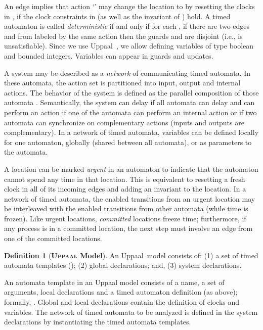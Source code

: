 \documentclass[copyright,creativecommons]{eptcs}
\theoremstyle{definition}
\newtheorem{definition}{Definition}
\newcommand{\Uppaal}{{\sc Uppaal}\xspace}
\begin{document}
An edge   implies that action `' may change the location  to  by resetting the clocks in ,  if the clock constraints in  (as well as the invariant of ) hold.
A timed automaton is called {\em deterministic} if and only if for
each , if there are two edges  and  from  labeled by the same
action 
then the guards  and  are disjoint (i.e.,  is unsatisfiable).
Since we use \Uppaal~\cite{LarsenPY97}, we allow defining variables of type boolean
and bounded integers. Variables can appear in
guards and updates.










A system may be described as a {\em network} of communicating timed automata. In these automata, the action set is partitioned into input, output and internal actions.
The behavior of the system is defined as the parallel composition of those automata . Semantically, the system can delay if all automata can delay and can perform an action if one of the automata can perform an internal action or if two automata can synchronize on complementary actions (inputs and outputs are complementary).
In a network of timed automata, variables can be defined locally for one automaton, globally (shared between all automata), or as  parameters to the automata.

A location can be marked  {\em urgent} in an automaton to indicate that the automaton cannot spend any time in that location. This is equivalent to resetting a fresh clock  in all of its incoming edges and adding an invariant  to the location.
In a network of timed automata, the enabled transitions from an urgent location may be interleaved with the enabled transitions from other automata (while time is frozen).
Like urgent locations, {\em committed} locations freeze time; furthermore, if any process is in a committed location, the next step must involve an edge from one of the committed locations.


\begin{definition}[\bf {\textsc {\bfseries Uppaal}} Model]
An \Uppaal\ model consists of: (1)  a set of timed automata templates (); (2) global declarations; and, (3) system declarations.
\end{definition}

An automata template in an \Uppaal model consists of a name, a set of arguments, local declarations and a timed automaton definition (as above); formally, .
Global and local declarations contain the definition of clocks and variables.
The network of timed automata to be analyzed is defined in the system declarations by instantiating the timed automata templates.
\end{document}

